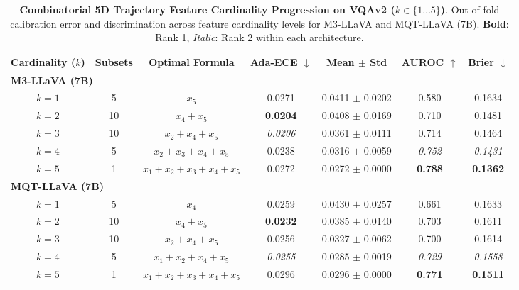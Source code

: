 \begin{table}[t]
\setlength{\tabcolsep}{3.5pt}
\renewcommand{\arraystretch}{1.05}
\centering
\footnotesize
\begin{tabular}{ccccccc}
\toprule
\textbf{Cardinality ($k$)} & \textbf{Subsets} & \textbf{Optimal Formula} & \textbf{Ada-ECE} $\downarrow$ & \textbf{Mean $\pm$ Std} & \textbf{AUROC} $\uparrow$ & \textbf{Brier} $\downarrow$ \\
\midrule
\multicolumn{7}{l}{\textbf{M3-LLaVA (7B)}} \\
\midrule
$k = 1$ & 5 & $x_{5}$ & 0.0271 & 0.0411 $\pm$ 0.0202 & 0.580 & 0.1634 \\
$k = 2$ & 10 & $x_{4} + x_{5}$ & \textbf{0.0204} & 0.0408 $\pm$ 0.0169 & 0.710 & 0.1481 \\
$k = 3$ & 10 & $x_{2} + x_{4} + x_{5}$ & \textit{0.0206} & 0.0361 $\pm$ 0.0111 & 0.714 & 0.1464 \\
$k = 4$ & 5 & $x_{2} + x_{3} + x_{4} + x_{5}$ & 0.0238 & 0.0316 $\pm$ 0.0059 & \textit{0.752} & \textit{0.1431} \\
$k = 5$ & 1 & $x_{1} + x_{2} + x_{3} + x_{4} + x_{5}$ & 0.0272 & 0.0272 $\pm$ 0.0000 & \textbf{0.788} & \textbf{0.1362} \\
\midrule
\multicolumn{7}{l}{\textbf{MQT-LLaVA (7B)}} \\
\midrule
$k = 1$ & 5 & $x_{4}$ & 0.0259 & 0.0430 $\pm$ 0.0257 & 0.661 & 0.1633 \\
$k = 2$ & 10 & $x_{4} + x_{5}$ & \textbf{0.0232} & 0.0385 $\pm$ 0.0140 & 0.703 & 0.1611 \\
$k = 3$ & 10 & $x_{2} + x_{4} + x_{5}$ & 0.0256 & 0.0327 $\pm$ 0.0062 & 0.700 & 0.1614 \\
$k = 4$ & 5 & $x_{1} + x_{2} + x_{4} + x_{5}$ & \textit{0.0255} & 0.0285 $\pm$ 0.0019 & \textit{0.729} & \textit{0.1558} \\
$k = 5$ & 1 & $x_{1} + x_{2} + x_{3} + x_{4} + x_{5}$ & 0.0296 & 0.0296 $\pm$ 0.0000 & \textbf{0.771} & \textbf{0.1511} \\
\bottomrule
\end{tabular}
\caption{\textbf{Combinatorial 5D Trajectory Feature Cardinality Progression on \textsc{VQAv2} ($k \in \{1 \dots 5\}$)}. Out-of-fold calibration error and discrimination across feature cardinality levels for M3-LLaVA and MQT-LLaVA (7B). \textbf{Bold}: Rank 1, \textit{Italic}: Rank 2 within each architecture.}
\label{tab:ablation_5d_vqav2}
\end{table}
